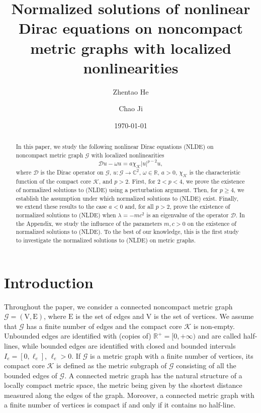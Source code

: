 \documentclass[11pt]{amsart}
\title[Nonlinear Dirac equations]{Normalized solutions of nonlinear Dirac equations on noncompact metric graphs with localized nonlinearities}
\author[Z. He]{Zhentao He}
\author[C. Ji]{Chao Ji}
\date{\today}
\newcommand{\abs}[1]{\lvert#1\rvert}
\newcommand{\D}{\mathcal{D}}
\newcommand{\G}{\mathcal{G}}
\newcommand{\K}{\mathcal{K}}
\numberwithin{equation}{section}
\begin{document}
\begin{abstract}
In this paper, we study the following nonlinear Dirac equations (NLDE) on noncompact metric graph $\G$ with localized nonlinearities
\begin{equation}
    \D u - \omega u= a\chi_\K\abs{u}^{p-2}u,
\end{equation}
where $\D$ is the Dirac operator on $\G$, $u: \G \to \mathbb{C}^2$, $\omega\in \mathbb{R}$, $a > 0$, $\chi_\K$ is the characteristic function of the compact core $\K$, and $p>2$. First, for $2<p<4$,  we prove the existence of normalized solutions to (NLDE) using a perturbation argument. Then, for $p \geq 4$, we establish the assumption under which normalized solutions to (NLDE) exist. Finally, we extend these results to the case $a<0$ and, for all $p>2$, prove the existence of normalized solutions to (NLDE) when $\lambda = -mc^2$ is an eigenvalue of the operator $\D$. In the Appendix, we study the influence of the parameters $m, c > 0$ on the existence of normalized solutions to (NLDE). To the best of our knowledge, this is the first study to  investigate the normalized solutions to (NLDE) on metric graphs.
\end{abstract}
\maketitle


\section{Introduction}

Throughout the paper, we consider a connected noncompact metric graph $\mathcal{G} = (\mathrm{V}, \mathrm{E})$, where $\mathrm{E}$ is the set
of edges and $\mathrm{V}$ is the set of vertices. We assume that $\mathcal{G}$ has a finite number of edges and the compact
core $\K$ is non-empty. Unbounded edges are identified with (copies of) $\mathbb{R}^+ =  [0, +\infty )$ and are called half-lines, while bounded edges are identified with closed and bounded intervals $I_e = [0, \ell_e]$, $\ell_e > 0$.  If $\G$ is a metric graph with a finite number of vertices, its compact core $\K$ is defined as the metric subgraph of $\G$ consisting of all the bounded edges of $\G$. A connected metric graph has the natural structure of a locally compact metric space, the metric being given by the shortest distance measured along
the edges of the graph. Moreover, a connected metric graph with a finite number of vertices is compact if and only if it contains no half-line.
\end{document}
